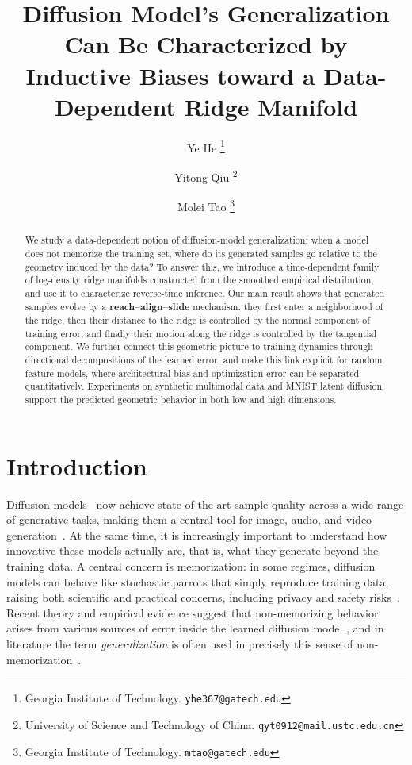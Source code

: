 \documentclass[11pt]{article}
\title{Diffusion Model's Generalization Can Be Characterized by \\ Inductive Biases toward a Data-Dependent Ridge Manifold}
\date{\vspace{-5ex}}
\author{
 Ye He \thanks{Georgia Institute of Technology. \texttt{yhe367@gatech.edu}}
 \and
 Yitong Qiu \thanks{University of Science and Technology of China. \texttt{qyt0912@mail.ustc.edu.cn}}
  \and
 Molei Tao \thanks{Georgia Institute of Technology. \texttt{mtao@gatech.edu}}
}
\begin{document}
\maketitle

  

\begin{abstract}

We study a data-dependent notion of diffusion-model generalization: when a model does not memorize the training set, where do its generated samples go relative to the geometry induced by the data? To answer this, we introduce a time-dependent family of log-density ridge manifolds constructed from the smoothed empirical distribution, and use it to characterize reverse-time inference. Our main result shows that generated samples evolve by a \textbf{reach--align--slide} mechanism: they first enter a neighborhood of the ridge, then their distance to the ridge is controlled by the normal component of training error, and finally their motion along the ridge is controlled by the tangential component. We further connect this geometric picture to training dynamics through directional decompositions of the learned error, and make this link explicit for random feature models, where architectural bias and optimization error can be separated quantitatively. Experiments on synthetic multimodal data and MNIST latent diffusion support the predicted geometric behavior in both low and high dimensions.


 \end{abstract}


\section{Introduction}

Diffusion models~\citep{sohl2015deep, ho2020denoising,song2020score} now achieve state-of-the-art sample quality across a wide range of generative tasks, making them a central tool for image, audio, and video generation~\citep{dhariwal2021diffusion,kong2020diffwave,brooks2024video}. At the same time, it is increasingly important to understand how innovative these models actually are, that is, what they generate beyond the training data. A central concern is memorization: in some regimes, diffusion models can behave like stochastic parrots that simply reproduce training data, raising both scientific and practical concerns, including privacy and safety risks~\citep{carlini2023extracting,somepalli2023understanding,duan2023diffusion,liu2024generative}. Recent theory and empirical evidence suggest that non-memorizing behavior arises from various sources of error inside the learned diffusion model \citep[e.g.,][]{ye2025provable}, and in literature the term \emph{generalization} is often used in precisely this sense of non-memorization~\citep[e.g.,][]{kadkhodaie2023generalization, zhang2023emergence}.
\end{document}
